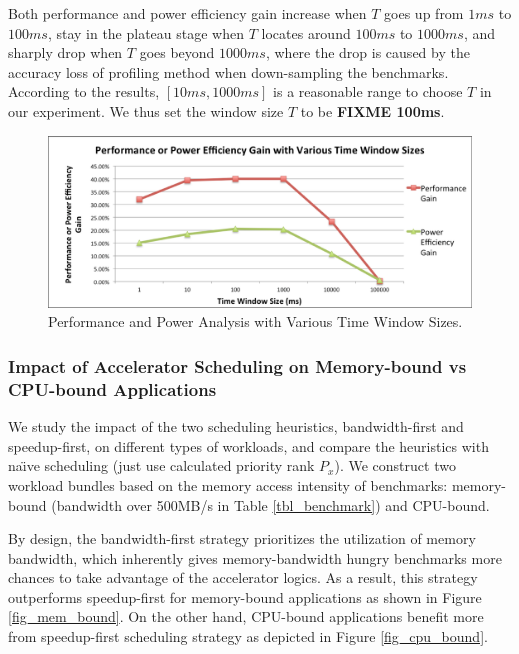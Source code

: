 Both performance and power efficiency gain increase when $T$ goes up
from $1 ms$ to $100 ms$, stay in the plateau stage when $T$ locates
around $100 ms$ to $1000 ms$, and sharply drop when $T$ goes beyond
$1000 ms$, where the drop is caused by the accuracy loss of profiling
method when down-sampling the benchmarks. According to the results,
$[10 ms, 1000 ms]$ is a reasonable range to choose $T$ in our
experiment. We thus set the window size $T$ to be {\bf FIXME 100ms}.

\begin{figure}
    \centering
    \includegraphics[width=4.5in]{Time-Window-Size}
    \caption{Performance and Power Analysis with Various Time Window Sizes.}
    \label{fig_time_window}
\end{figure}

\subsubsection{Impact of Accelerator Scheduling on Memory-bound vs
  CPU-bound Applications}

We study the impact of the two scheduling heuristics, bandwidth-first
and speedup-first, on different types of workloads, and compare the
heuristics with na\"{\i}ve scheduling (just use calculated priority
rank $P_x$).  We construct two workload bundles based on the memory
access intensity of benchmarks: memory-bound (bandwidth over 500MB/s
in Table \ref{tbl_benchmark}) and CPU-bound.

By design, the
bandwidth-first strategy prioritizes the utilization of memory
bandwidth, which inherently gives memory-bandwidth hungry benchmarks
more chances to take advantage of the accelerator logics. As a result,
this strategy outperforms speedup-first for memory-bound
applications as shown in Figure \ref{fig_mem_bound}. On the other hand,
CPU-bound applications benefit more from speedup-first
scheduling strategy as depicted in Figure \ref{fig_cpu_bound}.

